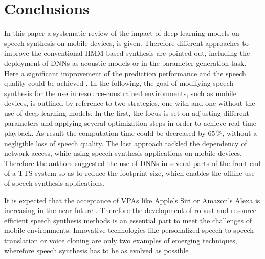

\section{Conclusions}
\label{sec:conclusion}

In this paper a systematic review of the impact of deep learning models on speech synthesis on mobile devices, is given. Therefore different approaches to improve the conventional \ac{HMM}-based synthesis are pointed out, including the deployment of \acp{DNN} as acoustic models or in the parameter generation task. Here a significant improvement of the prediction performance and the speech quality could be achieved \cite{zen:deepstatistical, hashimoto:effect}. In the following, the goal of modifying speech synthesis for the use in resource-constrained environments, such as mobile devices, is outlined by reference to two strategies, one with and one without the use of deep learning models. In the first, the focus is set on adjusting different parameters and applying several optimization steps \cite{toth:optimizing} in order to achieve real-time playback. As result the computation time could be decreased by 65\,\%, without a negligible loss of speech quality. The last approach \cite{boros:robust} tackled the dependency of network access, while using speech synthesis applications on mobile devices. Therefore the authors suggested the use of \acp{DNN} in several parts of the front-end of a \ac{TTS} system so as to reduce the footprint size, which enables the offline use of speech synthesis applications.

It is expected that the acceptance of \acp{VPA} like Apple's Siri or Amazon's Alexa is increasing in the near future \cite{gartner:assistants}. Therefore the development of robust and resource-efficient speech synthesis methods is an essential part to meet the challenges of mobile environments. Innovative technologies like personalized speech-to-speech translation or voice cloning are only two examples of emerging techniques, wherefore speech synthesis has to be as evolved as possible~\cite{edinburgh:speech}.

\iffalse
\vspace{2em}
See \cite{edinburgh:speech}
\begin{itemize}[leftmargin=10pt]
	\item Voice cloning
	\item Voice reconstruction
	\item Personalised speech-to-speech translation
	\item Articulatory-controllable speech synthesis
\end{itemize}
\fi